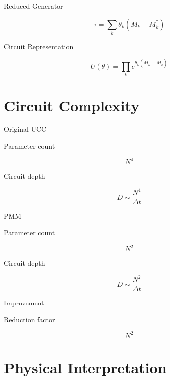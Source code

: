 \documentclass{beamer}
\begin{document}
\begin{frame}{Reduced Generator}

  \[
  \tau =
  \sum_k \theta_k (M_k-M_k^\dagger)
  \]

\end{frame}

\begin{frame}{Circuit Representation}

  \[
  U(\theta)=
  \prod_k
  e^{\theta_k(M_k-M_k^\dagger)}
  \]

\end{frame}

\section{Circuit Complexity}

\begin{frame}{Original UCC}

  Parameter count

  \[
  N^4
  \]

  Circuit depth

  \[
  D \sim \frac{N^4}{\Delta t}
  \]

\end{frame}

\begin{frame}{PMM}

  Parameter count

  \[
  N^2
  \]

  Circuit depth

  \[
  D \sim \frac{N^2}{\Delta t}
  \]

\end{frame}

\begin{frame}{Improvement}

  Reduction factor

  \[
  N^2
  \]

\end{frame}

\section{Physical Interpretation}
\end{document}
